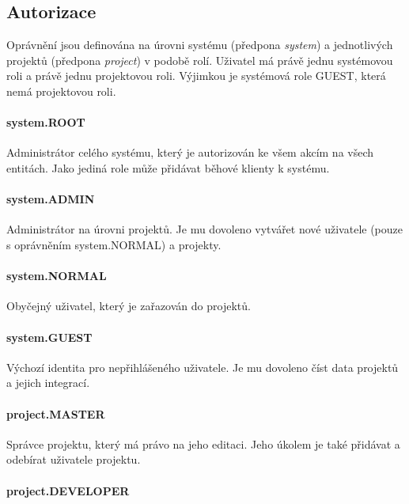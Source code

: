 \subsection{Autorizace}

Oprávnění jsou definována na úrovni systému (předpona \textit{system}) a jednotlivých projektů (předpona \textit{project}) v podobě rolí.
Uživatel má právě jednu systémovou roli a právě jednu projektovou roli.
Výjimkou je systémová role GUEST, která nemá projektovou roli.

\paragraph{system.ROOT}

Administrátor celého systému, který je autorizován ke všem akcím na všech entitách.
Jako jediná role může přidávat běhové klienty k systému.

\paragraph{system.ADMIN}

Administrátor na úrovni projektů.
Je mu dovoleno vytvářet nové uživatele (pouze s oprávněním system.NORMAL) a projekty.

\paragraph{system.NORMAL}

Obyčejný uživatel, který je zařazován do projektů.

\paragraph{system.GUEST}

Výchozí identita pro nepřihlášeného uživatele.
Je mu dovoleno číst data projektů a jejich integrací.

\paragraph{project.MASTER}

Správce projektu, který má právo na jeho editaci.
Jeho úkolem je také přidávat a odebírat uživatele projektu.

\paragraph{project.DEVELOPER}

